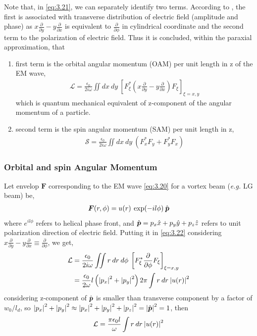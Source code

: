 \documentclass[11pt,a4paper]{article}
\numberwithin{equation}{section}
\begin{document}
Note that, in \ref{eq:3.21}, we can separately identify two terms. According to \cite{WO}, the first is associated with transverse distribution of electric field (amplitude and phase) as 
$x\frac{\partial}{\partial y} - y\frac{\partial}{\partial x}$
is equivalent to $\frac{\partial}{\partial\phi}$ in cylindrical coordinate and the second term to the polarization of electric field. Thus it is concluded,\cite{enk nien 92} within the paraxial approximation, that
\begin{enumerate}
	\item 
	first term is the orbital angular momentum (OAM) per unit length in z of the EM wave,
	\begin{align}
		\mathcal{L} = \frac{\epsilon_0}{2i\omega} \iint dx\:dy\:\left[F_\xi^\ast\left(x\frac{\partial}{\partial y} - y\frac{\partial}{\partial x}\right)F_\xi\right]_{\xi=x,y} \label{eq:3.22}
	\end{align}
	which is quantum mechanical equivalent of z-component of the angular momentum of a particle.
	
	\item 
	second term is the spin angular momentum (SAM) per unit length in z,
	\begin{align}
		\mathcal{S} = \frac{\epsilon_0}{2i\omega}\iint dx\:dy\: (F_x^\ast F_y + F_y^\ast F_x) \label{eq:3.23}
	\end{align}
\end{enumerate}
\subsubsection{Orbital and spin Angular Momentum}
Let envelop $\boldsymbol{F}$ corresponding to the EM wave \ref{eq:3.20} for a vortex beam (\textit{e.g.} LG beam) be,
\begin{align}
	\boldsymbol{F}(r,\phi)= u(r)\:\exp(-il\phi)\:\Hat{\boldsymbol{p}}
\end{align} where $e^{il\phi}$ refers to helical phase front, and $\Hat{\boldsymbol{p}} = p_x\Hat{x}+ p_y\Hat{y}+p_z\Hat{z}$ refers to unit polarization direction of electric field. Putting it in \ref{eq:3.22} considering $x\frac{\partial}{\partial y} - y\frac{\partial}{\partial x} \equiv \frac{\partial}{\partial\phi}$, we get,
\begin{align}
	\mathcal{L}&=\frac{\epsilon_0}{2i\omega} \iint r\:dr\:d\phi\:\left[F_\xi^\ast\frac{\partial}{\partial\phi}F_\xi\right]_{\xi=x,y}\nonumber\\
	&= 	\frac{\epsilon_0}{2\omega} l \left(\abs{p_x}^2+\abs{p_y}^2\right)2\pi \int r\:dr\:\abs{u(r)}^2 \nonumber
\end{align}
considering z-component of $\Hat{\boldsymbol{p}}$ is smaller than transverse component by a factor of $w_0/l_d$, so $\abs{p_x}^2+\abs{p_y}^2 \approx \abs{p_x}^2+\abs{p_y}^2+\abs{p_z}^2 = \abs{\Hat{\boldsymbol{p}}}^2 = 1$, then
\begin{align}
	\mathcal{L}=\frac{\pi\epsilon_0l}{\omega}\int r\:dr\:\abs{u(r)}^2 \label{eq:3.25}
\end{align}
\end{document}
